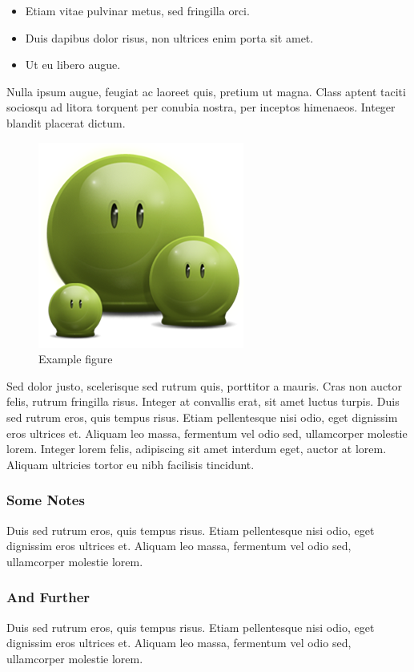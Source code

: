 \begin{itemize}
\item Etiam vitae pulvinar metus, sed fringilla orci. 
\item Duis dapibus dolor risus, non ultrices enim porta sit amet. 
\item Ut eu libero augue. 
\end{itemize}

Nulla ipsum augue, feugiat ac laoreet quis, pretium ut magna. Class aptent taciti sociosqu ad litora torquent per conubia nostra, per inceptos himenaeos. Integer blandit placerat dictum.

\begin{figure}[p!]\centering
\includegraphics[width=.5\textwidth]{green}
\caption{Example figure}
\end{figure}

Sed dolor justo, scelerisque sed rutrum quis, porttitor a mauris. Cras non auctor felis, rutrum fringilla risus. Integer at convallis erat, sit amet luctus turpis. Duis sed rutrum eros, quis tempus risus. Etiam pellentesque nisi odio, eget dignissim eros ultrices et. Aliquam leo massa, fermentum vel odio sed, ullamcorper molestie lorem. Integer lorem felis, adipiscing sit amet interdum eget, auctor at lorem. Aliquam ultricies tortor eu nibh facilisis tincidunt.


\subsubsection{Some Notes}

Duis sed rutrum eros, quis tempus risus. Etiam pellentesque nisi odio, eget dignissim eros ultrices et. Aliquam leo massa, fermentum vel odio sed, ullamcorper molestie lorem.

\subsubsection{And Further}
Duis sed rutrum eros, quis tempus risus. Etiam pellentesque nisi odio, eget dignissim eros ultrices et. Aliquam leo massa, fermentum vel odio sed, ullamcorper molestie lorem.


